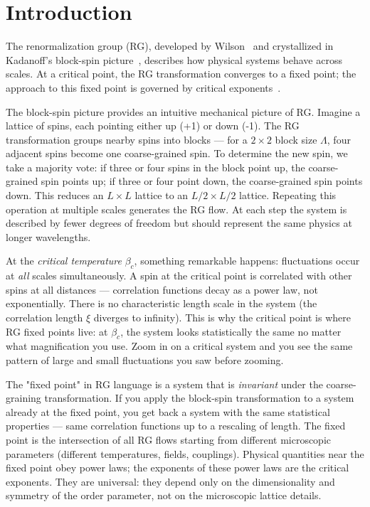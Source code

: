 \documentclass[12pt,a4paper]{memoir}
\begin{document}
\section{Introduction}
\label{sec:intro}

The renormalization group (RG), developed by Wilson~\citep{wilson1975}
and crystallized in Kadanoff's block-spin picture~\citep{kadanoff1966},
describes how physical systems behave across scales.  At a critical point,
the RG transformation converges to a fixed point; the approach to this
fixed point is governed by critical exponents~\citep{goldenfeld1992,zinn2021}.

The block-spin picture provides an intuitive mechanical picture of RG.
Imagine a lattice of spins, each pointing either up (+1) or down (-1).  The RG
transformation groups nearby spins into blocks --- for a $2\times2$ block
size $\Lambda$, four adjacent spins become one coarse-grained spin.  To
determine the new spin, we take a majority vote: if three or four spins in the
block point up, the coarse-grained spin points up; if three or four point
down, the coarse-grained spin points down.  This reduces an $L\times L$
lattice to an $L/2\times L/2$ lattice.  Repeating this operation at multiple
scales generates the RG flow.  At each step the system is described by fewer
degrees of freedom but should represent the same physics at longer
wavelengths.

At the \emph{critical temperature} $\beta_c$, something remarkable
happens: fluctuations occur at \emph{all} scales simultaneously.  A spin at
the critical point is correlated with other spins at all distances ---
correlation functions decay as a power law, not exponentially.  There is no
characteristic length scale in the system (the correlation length $\xi$
diverges to infinity).  This is why the critical point is where RG fixed
points live: at $\beta_c$, the system looks statistically the same no matter
what magnification you use.  Zoom in on a critical system and you see the same
pattern of large and small fluctuations you saw before zooming.

The "fixed point" in RG language is a system that is \emph{invariant}
under the coarse-graining transformation.  If you apply the block-spin
transformation to a system already at the fixed point, you get back a system
with the same statistical properties --- same correlation functions up to a
rescaling of length.  The fixed point is the intersection of all RG flows
starting from different microscopic parameters (different temperatures, fields,
couplings).  Physical quantities near the fixed point obey power laws;
the exponents of these power laws are the critical exponents.  They are
universal: they depend only on the dimensionality and symmetry of the order
parameter, not on the microscopic lattice details.
\end{document}
